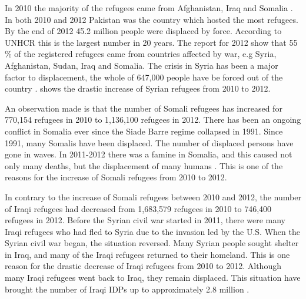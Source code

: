 In 2010 the majority of the refugees came from Afghanistan, Iraq and Somalia \cite{UNHCRstat2010}. In both 2010 and 2012 Pakistan was the country which hosted the most refugees. By the end of 2012 45.2 million people were displaced by force. According to UNHCR this is the largest number in 20 years. The report for 2012 show that 55 \% of the registered refugees came from countries affected by war, e.g Syria, Afghanistan, Sudan, Iraq and Somalia.  The crisis in Syria has been a major factor to displacement, the whole of 647,000 people have be forced out of the country \cite{UNHCRstat2012}.  shows the drastic increase of Syrian refugees from 2010 to 2012. 

An observation made is that the number of Somali refugees has increased for 770,154 refugees in 2010 to 1,136,100 refugees in 2012. There has been an ongoing conflict in Somalia ever since the Siade Barre regime collapsed in 1991. Since 1991, many Somalis have been displaced. The number of displaced persons have gone in waves. In 2011-2012 there was a famine in Somalia, and this caused not only many deaths, but the displacement of many humans \cite{somalia}. This is one of the reasons for the increase of Somali refugees from 2010 to 2012. 

In contrary to the increase of Somali refugees between 2010 and 2012, the number of Iraqi refugees had decreased from 1,683,579 refugees in 2010 to 746,400 refugees in 2012. Before the Syrian civil war started in 2011, there were many Iraqi refugees who had fled to Syria due to the invasion led by the U.S. When the Syrian civil war began, the situation reversed. Many Syrian people sought shelter in Iraq, and many of the Iraqi refugees returned to their homeland. This is one reason for the drastic decrease of Iraqi refugees from 2010 to 2012. Although many Iraqi refugees went back to Iraq, they remain displaced. This situation have brought the number of Iraqi IDPs up to approximately 2.8 million \citep{iraq}. 

